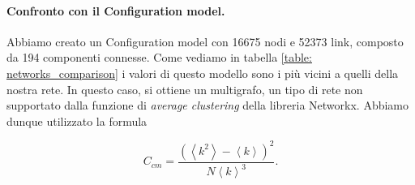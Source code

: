      \paragraph{\tab Confronto con il Configuration model.}
     Abbiamo creato un Configuration model con 16675 nodi e 52373 link, composto da 194 componenti connesse. Come vediamo in tabella \ref{table: networks_comparison} i valori di questo modello sono i più vicini a quelli della nostra rete. In questo caso, si ottiene un multigrafo, un tipo di rete non supportato dalla funzione di \textit{average clustering} della libreria Networkx. Abbiamo dunque utilizzato la formula \cite{barabasicap7}
        
        \begin{equation}
            C_{cm}=\frac{\left( \left<k^2\right>-\left<k\right>\right)^2}{N \left<k\right>^3}.
            \label{clustering_configuration}
        \end{equation}
        
